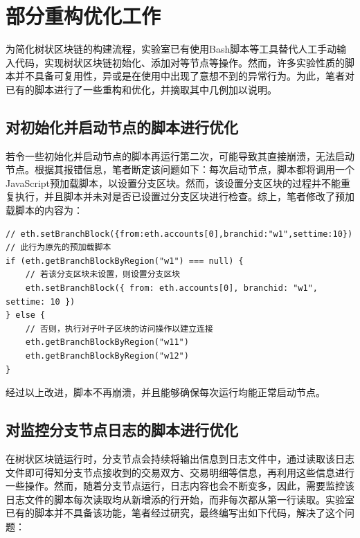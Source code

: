 \section{部分重构优化工作}

为简化树状区块链的构建流程，实验室已有使用Bash脚本等工具替代人工手动输入代码，实现树状区块链初始化、添加对等节点等操作。然而，许多实验性质的脚本并不具备可复用性，异或是在使用中出现了意想不到的异常行为。为此，笔者对已有的脚本进行了一些重构和优化，并摘取其中几例加以说明。

\subsection{对初始化并启动节点的脚本进行优化}

若令一些初始化并启动节点的脚本再运行第二次，可能导致其直接崩溃，无法启动节点。根据其报错信息，笔者断定该问题如下：每次启动节点，脚本都将调用一个JavaScript预加载脚本，以设置分支区块。然而，该设置分支区块的过程并不能重复执行，并且脚本并未对是否已设置过分支区块进行检查。综上，笔者修改了预加载脚本的内容为：

\begin{lstlisting}[caption={修改后的预加载脚本}]
// eth.setBranchBlock({from:eth.accounts[0],branchid:"w1",settime:10})  // 此行为原先的预加载脚本
if (eth.getBranchBlockByRegion("w1") === null) {
    // 若该分支区块未设置，则设置分支区块
    eth.setBranchBlock({ from: eth.accounts[0], branchid: "w1", settime: 10 })
} else {
    // 否则，执行对子叶子区块的访问操作以建立连接
    eth.getBranchBlockByRegion("w11")
    eth.getBranchBlockByRegion("w12")
}
\end{lstlisting}

经过以上改进，脚本不再崩溃，并且能够确保每次运行均能正常启动节点。

\subsection{对监控分支节点日志的脚本进行优化}

在树状区块链运行时，分支节点会持续将输出信息到日志文件中，通过读取该日志文件即可得知分支节点接收到的交易双方、交易明细等信息，再利用这些信息进行一些操作。然而，随着分支节点运行，日志内容也会不断变多，因此，需要监控该日志文件的脚本每次读取均从新增添的行开始，而非每次都从第一行读取。实验室已有的脚本并不具备该功能，笔者经过研究，最终编写出如下代码，解决了这个问题：


